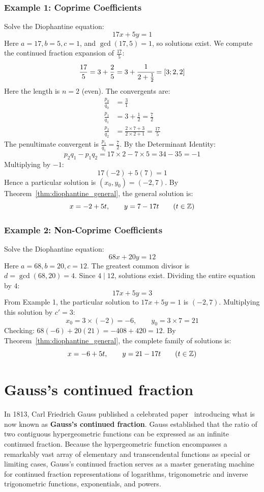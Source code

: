 \documentclass[a4paper]{article}
\begin{document}
\subsubsection{Example 1: Coprime Coefficients}
Solve the Diophantine equation:
\[
  17 x + 5 y = 1
\]
Here $a = 17, b = 5, c = 1$, and $\gcd(17, 5) = 1$, so solutions exist.
We compute the continued fraction expansion of $\frac{17}{5}$:
\[
  \frac{17}{5} = 3 + \frac{2}{5} = 3 + \cfrac{1}{2 + \frac{1}{2}} = [3; 2, 2]
\]
Here the length is $n = 2$ (even).
The convergents are:
\begin{align*}
  \frac{p_0}{q_0} & = \frac{3}{1} \\
  \frac{p_1}{q_1} & = 3 + \frac{1}{2} = \frac{7}{2} \\
  \frac{p_2}{q_2} & = \frac{2 \times 7 + 3}{2 \times 2 + 1} = \frac{17}{5}
\end{align*}
The penultimate convergent is $\frac{p_1}{q_1} = \frac{7}{2}$.
By the Determinant Identity:
\[
  p_2 q_1 - p_1 q_2 = 17 \times 2 - 7 \times 5 = 34 - 35 = -1
\]
Multiplying by $-1$:
\[
  17(-2) + 5(7) = 1
\]
Hence a particular solution is $(x_0, y_0) = (-2, 7)$.
By Theorem~\ref{thm:diophantine_general}, the general solution is:
\[
  x = -2 + 5t, \qquad y = 7 - 17t \qquad (t \in \mathbb{Z})
\]

\subsubsection{Example 2: Non-Coprime Coefficients}
Solve the Diophantine equation:
\[
  68 x + 20 y = 12
\]
Here $a = 68, b = 20, c = 12$.
The greatest common divisor is $d = \gcd(68, 20) = 4$.
Since $4 \mid 12$, solutions exist.
Dividing the entire equation by $4$:
\[
  17 x + 5 y = 3
\]
From Example 1, the particular solution to $17 x + 5 y = 1$ is $(-2, 7)$.
Multiplying this solution by $c' = 3$:
\[
  x_0 = 3 \times (-2) = -6, \qquad y_0 = 3 \times 7 = 21
\]
Checking: $68(-6) + 20(21) = -408 + 420 = 12$.
By Theorem~\ref{thm:diophantine_general}, the complete family of solutions is:
\[
  x = -6 + 5t, \qquad y = 21 - 17t \qquad (t \in \mathbb{Z})
\]


\section{Gauss's continued fraction}\label{cf:sec:gauss's-continued-fraction}
In 1813, Carl Friedrich Gauss published a celebrated paper~\cite{gauss1813} introducing what is now known as \textbf{Gauss's continued fraction}.
Gauss established that the ratio of two contiguous hypergeometric functions can be expressed as an infinite continued fraction.
Because the hypergeometric function encompasses a remarkably vast array of elementary and transcendental functions as special or limiting cases, Gauss's continued fraction serves as a master generating machine for continued fraction representations of logarithms, trigonometric and inverse trigonometric functions, exponentials, and powers.
\end{document}
